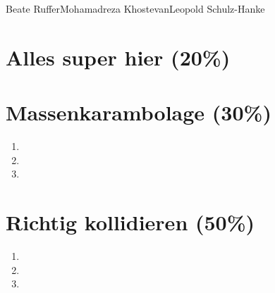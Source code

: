\documentclass{pi1}
\begin{document}
		{Beate Ruffer}{Mohamadreza Khostevan}{Leopold Schulz-Hanke}

\section{Alles super hier (20\%)}



\section{Massenkarambolage (30\%)}
\label{s:collider}

\begin{enumerate}

\item 

\item 

\item 

\end{enumerate}



\section{Richtig kollidieren (50\%)}



\begin{enumerate}

\item 

\item 

\item 

\end{enumerate}
\end{document}
